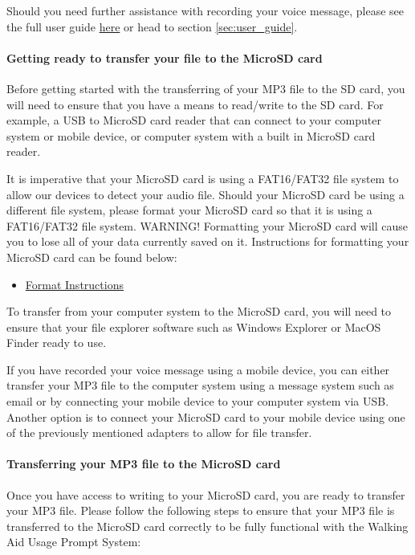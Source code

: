 				Should you need further assistance with recording your voice message, please see the full user guide \hyperref[sec:user_guide]{here} or head to section \ref{sec:user_guide}.

				\paragraph{Getting ready to transfer your file to the MicroSD card}\mbox{}

				Before getting started with the transferring of your MP3 file to the SD card, you will need to ensure that you have a means to read/write to the SD card. For example, a USB to MicroSD card reader that can connect to your computer system or mobile device, or computer system with a built in MicroSD card reader.

				It is imperative that your MicroSD card is using a FAT16/FAT32 file system to allow our devices to detect your audio file. Should your MicroSD card be using a different file system, please format your MicroSD card so that it is using a FAT16/FAT32 file system. WARNING! Formatting your MicroSD card will cause you to lose all of your data currently saved on it. Instructions for formatting your MicroSD card can be found below:

				\begin{itemize}
					\item \href{https://www.bu.edu/comtech/students/technical-guides/hardware/how-to-format-hard-drives/}{Format Instructions}
				\end{itemize}

				To transfer from your computer system to the MicroSD card, you will need to ensure that your file explorer software such as Windows Explorer or MacOS Finder ready to use.

				If you have recorded your voice message using a mobile device, you can either transfer your MP3 file to the computer system using a message system such as email or by connecting your mobile device to your computer system via USB. Another option is to connect your MicroSD card to your mobile device using one of the previously mentioned adapters to allow for file transfer.

				\paragraph{Transferring your MP3 file to the MicroSD card}\mbox{}

				Once you have access to writing to your MicroSD card, you are ready to transfer your MP3 file. Please follow the following steps to ensure that your MP3 file is transferred to the MicroSD card correctly to be fully functional with the Walking Aid Usage Prompt System:

